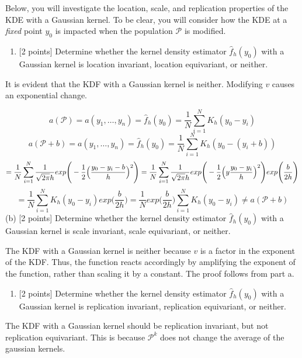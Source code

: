 \documentclass[
]{article}
\providecommand{\tightlist}{%
  \setlength{\itemsep}{0pt}\setlength{\parskip}{0pt}}
\begin{document}
Below, you will investigate the location, scale, and replication
properties of the KDE with a Gaussian kernel. To be clear, you will
consider how the KDE at a \emph{fixed} point \(y_0\) is impacted when
the population \(\mathcal{P}\) is modified.

\begin{enumerate}
\def\labelenumi{(\alph{enumi})}
\tightlist
\item
  {[}2 points{]} Determine whether the kernel density estimator
  \(\hat{f}_h(y_0)\) with a Gaussian kernel is location invariant,
  location equivariant, or neither.
\end{enumerate}

It is evident that the KDF with a Gaussian kernel is neither. Modifying
\(v\) causes an exponential change.

\[
a(\mathcal P) = a(y_1, \dots,y_n) = \hat f_h(y_0) = \frac{1}{N}\sum_{i=1}^NK_h(y_0 - y_i)
\] \[
a(\mathcal P + b) = a(y_1,\dots,y_n) = \hat f_h(y_0) = \frac{1}{N}\sum_{i=1}^NK_h(y_0 - (y_i + b))
\] \[
= \frac{1}{N}\sum_{i=1}^N\frac{1}{\sqrt{2\pi}h}exp\Bigg(-\frac{1}{2}\Big(\frac{y_0 - y_i - b}{h}\Big)^2\Bigg) \\
= \frac{1}{N}\sum_{i=1}^N\frac{1}{\sqrt{2\pi}h}exp\Bigg(-\frac{1}{2}\Big(y\frac{y_0-y_i}{h}\Big)^2\Bigg)exp\Bigg(\frac{b}{2h}\Bigg)
\] \[
=\frac{1}{N}\sum_{i=1}^NK_h(y_0-y_i)exp\Big(\frac{b}{2h}\Big) = \frac{1}{N}exp\Big(\frac{b}{2h}\Big)\sum_{i=1}^NK_{h}(y_0-y_i) \neq a(\mathcal P + b)
\] (b) {[}2 points{]} Determine whether the kernel density estimator
\(\hat{f}_h(y_0)\) with a Gaussian kernel is scale invariant, scale
equivariant, or neither.

The KDF with a Gaussian kernel is neither because \(v\) is a factor in
the exponent of the KDF. Thus, the function reacts accordingly by
amplifying the exponent of the function, rather than scaling it by a
constant. The proof follows from part a.

\begin{enumerate}
\def\labelenumi{(\alph{enumi})}
\setcounter{enumi}{2}
\tightlist
\item
  {[}2 points{]} Determine whether the kernel density estimator
  \(\hat{f}_h(y_0)\) with a Gaussian kernel is replication invariant,
  replication equivariant, or neither.
\end{enumerate}

The KDF with a Gaussian kernel should be replication invariant, but not
replication equivariant. This is because \(\mathcal P^k\) does not
change the average of the gaussian kernels.
\end{document}
